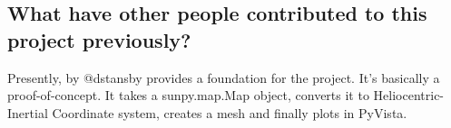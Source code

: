 \subsection{What have other people contributed to this project previously?}
    Presently, \pr by @dstansby provides a foundation for the project. It's basically a proof-of-concept.
    It takes a sunpy.map.Map object, converts it to Heliocentric-Inertial Coordinate system, creates a mesh and finally plots in PyVista.
    
